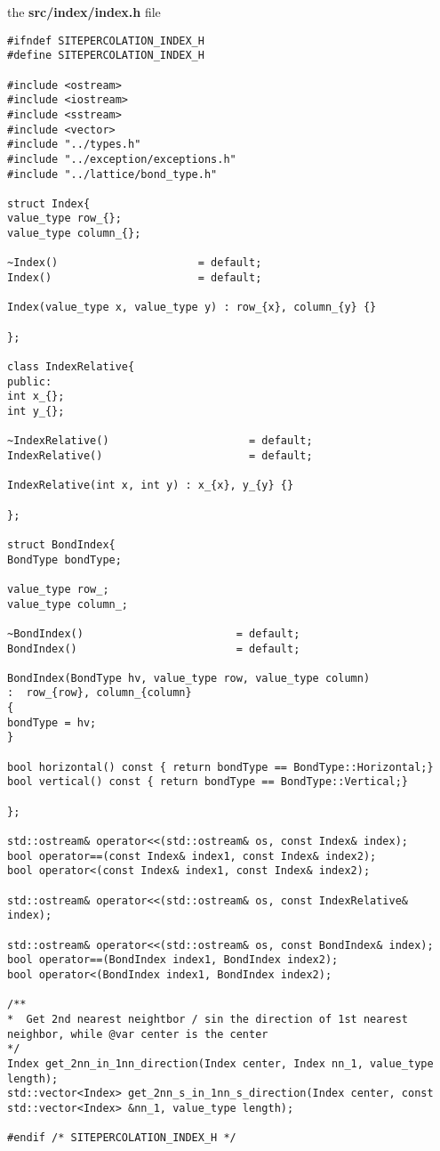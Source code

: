 
the \textbf{src/index/index.h} file
\begin{lstlisting}[style=CStyle]
#ifndef SITEPERCOLATION_INDEX_H
#define SITEPERCOLATION_INDEX_H

#include <ostream>
#include <iostream>
#include <sstream>
#include <vector>
#include "../types.h"
#include "../exception/exceptions.h"
#include "../lattice/bond_type.h"

struct Index{
value_type row_{};
value_type column_{};

~Index()                      = default;
Index()                       = default;

Index(value_type x, value_type y) : row_{x}, column_{y} {}

};

class IndexRelative{
public:
int x_{};
int y_{};

~IndexRelative()                      = default;
IndexRelative()                       = default;

IndexRelative(int x, int y) : x_{x}, y_{y} {}

};

struct BondIndex{
BondType bondType;

value_type row_;
value_type column_;

~BondIndex()                        = default;
BondIndex()                         = default;

BondIndex(BondType hv, value_type row, value_type column)
:  row_{row}, column_{column}
{
bondType = hv;
}

bool horizontal() const { return bondType == BondType::Horizontal;}
bool vertical() const { return bondType == BondType::Vertical;}

};

std::ostream& operator<<(std::ostream& os, const Index& index);
bool operator==(const Index& index1, const Index& index2);
bool operator<(const Index& index1, const Index& index2);

std::ostream& operator<<(std::ostream& os, const IndexRelative& index);

std::ostream& operator<<(std::ostream& os, const BondIndex& index);
bool operator==(BondIndex index1, BondIndex index2);
bool operator<(BondIndex index1, BondIndex index2);

/**
*  Get 2nd nearest neightbor / sin the direction of 1st nearest neighbor, while @var center is the center
*/
Index get_2nn_in_1nn_direction(Index center, Index nn_1, value_type length);
std::vector<Index> get_2nn_s_in_1nn_s_direction(Index center, const std::vector<Index> &nn_1, value_type length);

#endif /* SITEPERCOLATION_INDEX_H */
\end{lstlisting}


